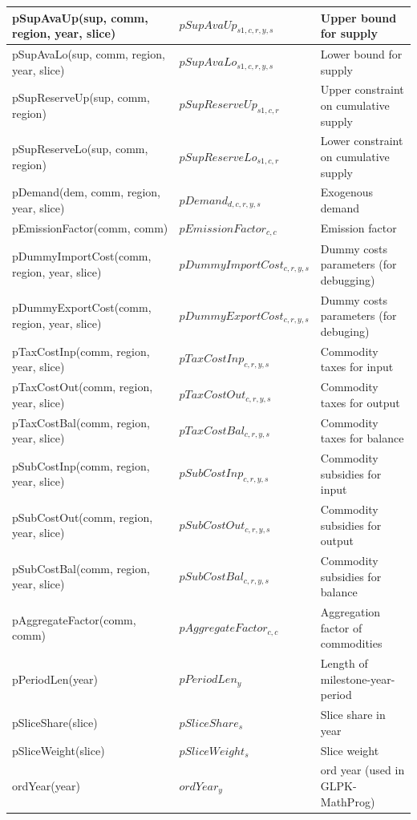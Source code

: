 \documentclass{article}
\begin{document}
\begin{longtable}{|p{10cm}|p{5cm}|p{9cm}|}
 \hline
pSupAvaUp(sup, comm, region, year, slice) & $pSupAvaUp_{s1,c,r,y,s}$ & Upper bound for supply \\ 
 \hline
pSupAvaLo(sup, comm, region, year, slice) & $pSupAvaLo_{s1,c,r,y,s}$ & Lower bound for supply \\ 
 \hline
pSupReserveUp(sup, comm, region) & $pSupReserveUp_{s1,c,r}$ & Upper constraint on cumulative supply \\ 
 \hline
pSupReserveLo(sup, comm, region) & $pSupReserveLo_{s1,c,r}$ & Lower constraint on cumulative supply \\ 
 \hline
pDemand(dem, comm, region, year, slice) & $pDemand_{d,c,r,y,s}$ & Exogenous demand \\ 
 \hline
pEmissionFactor(comm, comm) & $pEmissionFactor_{c,c}$ & Emission factor \\ 
 \hline
pDummyImportCost(comm, region, year, slice) & $pDummyImportCost_{c,r,y,s}$ & Dummy costs parameters (for debugging) \\ 
 \hline
pDummyExportCost(comm, region, year, slice) & $pDummyExportCost_{c,r,y,s}$ & Dummy costs parameters (for debuging) \\ 
 \hline
pTaxCostInp(comm, region, year, slice) & $pTaxCostInp_{c,r,y,s}$ & Commodity taxes for input \\ 
 \hline
pTaxCostOut(comm, region, year, slice) & $pTaxCostOut_{c,r,y,s}$ & Commodity taxes for output \\ 
 \hline
pTaxCostBal(comm, region, year, slice) & $pTaxCostBal_{c,r,y,s}$ & Commodity taxes for balance \\ 
 \hline
pSubCostInp(comm, region, year, slice) & $pSubCostInp_{c,r,y,s}$ & Commodity subsidies for input \\ 
 \hline
pSubCostOut(comm, region, year, slice) & $pSubCostOut_{c,r,y,s}$ & Commodity subsidies for output \\ 
 \hline
pSubCostBal(comm, region, year, slice) & $pSubCostBal_{c,r,y,s}$ & Commodity subsidies for balance \\ 
 \hline
pAggregateFactor(comm, comm) & $pAggregateFactor_{c,c}$ & Aggregation factor of commodities \\ 
 \hline
pPeriodLen(year) & $pPeriodLen_{y}$ & Length of milestone-year-period \\ 
 \hline
pSliceShare(slice) & $pSliceShare_{s}$ & Slice share in year \\ 
 \hline
pSliceWeight(slice) & $pSliceWeight_{s}$ & Slice weight \\ 
 \hline
ordYear(year) & $ordYear_{y}$ & ord year (used in GLPK-MathProg) \\ 

\end{longtable}
\end{document}
